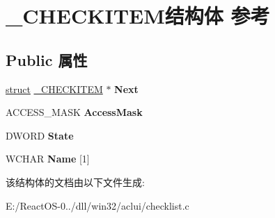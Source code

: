 \hypertarget{struct___c_h_e_c_k_i_t_e_m}{}\section{\+\_\+\+C\+H\+E\+C\+K\+I\+T\+E\+M结构体 参考}
\label{struct___c_h_e_c_k_i_t_e_m}
\subsection*{Public 属性}
\begin{DoxyCompactItemize}
\item 
\mbox{\label{struct___c_h_e_c_k_i_t_e_m_a306fff8a7614fa8dae433804dff77806}} 
\hyperlink{interfacestruct}{struct} \hyperlink{struct___c_h_e_c_k_i_t_e_m}{\+\_\+\+C\+H\+E\+C\+K\+I\+T\+EM} $\ast$ {\bfseries Next}
\item 
\mbox{\label{struct___c_h_e_c_k_i_t_e_m_acc91731019815b896f0a8ece3df47389}} 
A\+C\+C\+E\+S\+S\+\_\+\+M\+A\+SK {\bfseries Access\+Mask}
\item 
\mbox{\label{struct___c_h_e_c_k_i_t_e_m_a68d4bc03cfa746fb5918b1544eaa51b2}} 
D\+W\+O\+RD {\bfseries State}
\item 
\mbox{\label{struct___c_h_e_c_k_i_t_e_m_afccb15293acdba3b48b5ab0d6592b846}} 
W\+C\+H\+AR {\bfseries Name} \mbox{[}1\mbox{]}
\end{DoxyCompactItemize}


该结构体的文档由以下文件生成\+:\begin{DoxyCompactItemize}
\item 
E\+:/\+React\+O\+S-\/0../dll/win32/aclui/checklist.\+c\end{DoxyCompactItemize}
